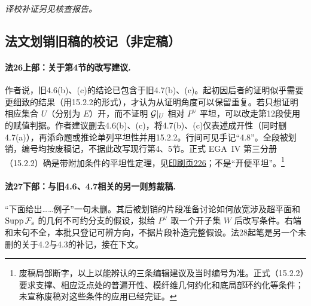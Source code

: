 \par\noindent\textit{译校补证另见核查报告。}
\subsection*{法文划销旧稿的校记（非定稿）}
\paragraph{法26上部：关于第4节的改写建议.}
作者说，旧4.6(b)、(c)的结论已包含于旧4.7(b)、(c)。起初因后者的证明似乎需要更细致的结果（用15.2.2的形式），才认为从证明角度可以保留重复。若只想证明相应集合 $U$（分别为 $E$）开，而不证明 $\mathcal G|_U$ 相对 $P^\vee$ 平坦，可以改走第12段使用的赋值判据。作者建议删去4.6(b)、(c)，将4.7(b)、(c)仅表述成开性（同时删4.7(a)），再添命题或推论单列平坦性并用15.2.2。行间可见手记“4.8”。全段被划销，编号均按废稿记，不据此改写现行第4、5节。正式 EGA~IV 第三分册（15.2.2）确是带附加条件的平坦性定理，见\href{https://www.numdam.org/item/PMIHES_1966__28__5_0/}{印刷页226}；不是“开便平坦”。\footnote{废稿局部断字，以上以能辨认的三条编辑建议及当时编号为准。正式（15.2.2）要求支撑、相应泛点处的普遍开性、模纤维几何约化和底局部环约化等条件；未宣称废稿对这些条件的应用已经完证。}

\paragraph{法27下部：与旧4.6、4.7相关的另一则剪裁稿.}
“下面给出……例子”一句未删。其后被划销的片段准备讨论如何放宽涉及超平面和 $\operatorname{Supp}\mathcal F_s$ 的几何不可约分支的假设，拟给 $P^\vee$ 取一个开子集 $W$ 后改写条件。右端和末句不全，本批只登记可辨方向，不据片段补造完整假设。法28起笔是另一个未删的关于4.2与4.3的补记，接在下文。

\endgroup
